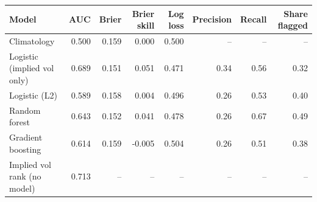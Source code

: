 \begin{tabular}{lrrrrrrr}
\toprule
Model & AUC & Brier & Brier skill & Log loss & Precision & Recall & Share flagged \\
\midrule
Climatology & 0.500 & 0.159 & 0.000 & 0.500 & -- & -- & -- \\
Logistic (implied vol only) & 0.689 & 0.151 & 0.051 & 0.471 & 0.34 & 0.56 & 0.32 \\
Logistic (L2) & 0.589 & 0.158 & 0.004 & 0.496 & 0.26 & 0.53 & 0.40 \\
Random forest & 0.643 & 0.152 & 0.041 & 0.478 & 0.26 & 0.67 & 0.49 \\
Gradient boosting & 0.614 & 0.159 & -0.005 & 0.504 & 0.26 & 0.51 & 0.38 \\
Implied vol rank (no model) & 0.713 & -- & -- & -- & -- & -- & -- \\
\bottomrule
\end{tabular}
